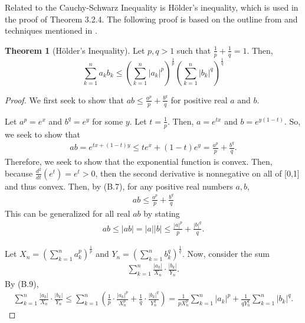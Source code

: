 \documentclass{scrippsthesisclass}
\theoremstyle{definition}
\newtheorem{theorem}{Theorem}[section]
\begin{document}
Related to the Cauchy-Schwarz Inequality is H\"{o}lder's inequality, which is used in the proof of Theorem 3.2.4. 
The following proof is based on the outline from \cite{thebook} and techniques mentioned in \cite{2148138}. 

\begin{theorem}[H\"{o}lder's Inequality]
    Let $p, q > 1$ such that $\frac{1}{p} + \frac{1}{q} = 1$.
    Then,
    \[
    \sum_{k=1}^n a_k b_k \leq \left(\sum_{k=1}^n |a_k|^p\right)^{\frac{1}{p}} \left(\sum_{k=1}^n |b_k|^q\right)^{\frac{1}{q}}
    \]
\end{theorem}
\begin{proof}
    We first seek to show that $ab \leq \frac{a^p}{p} + \frac{b^q}{q}$ for positive real $a$ and $b$. 

    Let $a^p = e^x$ and $b^q = e^y$ for some $y$.
    Let $t = \frac{1}{p}$. 
    Then, $a = e^{tx}$ and $b = e^{y(1-t)}$. 
    So, we seek to show that
    \begin{align}
        ab = e^{tx + (1-t)y} \leq te^{x} + (1-t)e^{y} = \frac{a^p}{p} + \frac{b^q}{q}.
    \end{align}
    Therefore, we seek to show that the exponential function is convex. 
    Then, because $\frac{d^2}{dt} \left(e^t\right) = e^t > 0$, then the second derivative is nonnegative on all of [0,1] and thus convex. 
    Then, by (B.7), for any positive real numbers $a, b$, 
    \begin{align}
        ab \leq \frac{a^p}{p} + \frac{b^q}{q}
    \end{align}
    This can be generalized for all real $ab$ by stating
    \begin{align}
        ab \leq |ab| = |a||b| \leq \frac{|a|^p}{p} + \frac{|b|^q}{q}.
    \end{align}

    Let $X_n = \left(\sum \limits_{k=1}^n a_k^p\right)^{\frac{1}{p}}$ and $Y_n =  \left(\sum \limits_{k=1}^n b_k^q\right)^{\frac{1}{q}}$. 
    Now, consider the sum
    \begin{align}
        \sum_{k=1}^n \frac{|a_k|}{X_n} \cdot \frac{|b_k|}{Y_n}.
    \end{align}
    By (B.9), 
    \begin{align}
        \sum_{k=1}^n \frac{|a_k|}{X_n} \cdot \frac{|b_k|}{Y_n} \leq \sum_{k=1}^n \left(\frac{1}{p} \cdot \frac{|a_k|^p}{X_n^p} + \frac{1}{q} \cdot \frac{|b_k|^q}{Y_n^q}\right) = \frac{1}{p X_n^p} \sum_{k=1}^n |a_k|^p + \frac{1}{q Y_n^q} \sum_{k=1}^n |b_k|^q.
    \end{align}


\end{proof}
\end{document}
